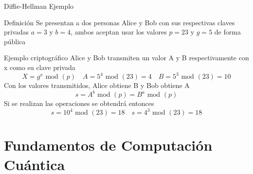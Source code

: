 \documentclass[aspectratio=169]{beamer}
\begin{document}
\begin{frame}{Diffie-Hellman Ejemplo}
\begin{block}{Definición}
Se presentan a dos personas Alice y Bob con sus respectivas claves privadas $a=3$ y $b=4$, ambos aceptan usar los valores $p=23$ y $g=5$  de forma pública

\end{block}

\begin{exampleblock}{Ejemplo criptográfico}
Alice y Bob transmiten un valor A y B respectivamente con x como su clave privada
$$X=g^x \text{ mod }(p) \quad A=5^4 \text{ mod }(23)=4 \quad B=5^3 \text{ mod }(23)=10$$
Con los valores transmitidos, Alice obtiene B y Bob obtiene A
$$s=A^b \text{ mod }(p)=B^a \text{ mod }(p)$$
Si se realizan las operaciones se obtendrá entonces
$$s=10^4 \text{ mod }(23)=18 \quad s=4^3 \text{ mod }(23)=18$$

\end{exampleblock}
\vspace{0.3cm}


\end{frame}

\section{Fundamentos de Computación Cuántica}
\end{document}
